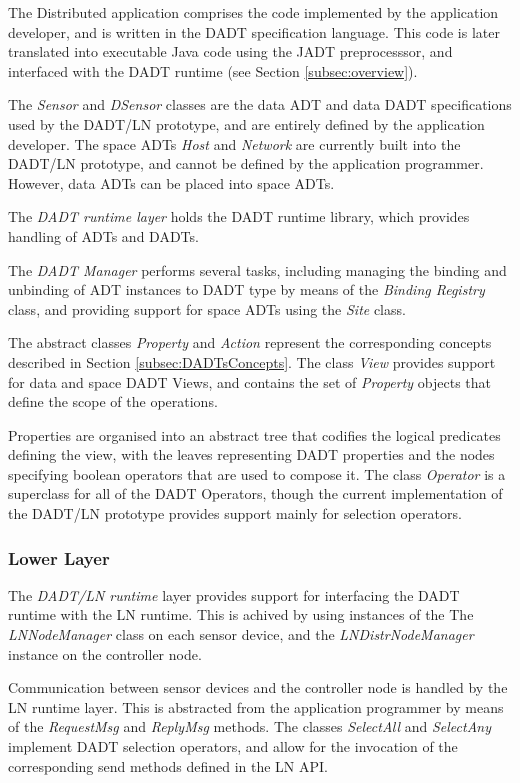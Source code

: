 The Distributed application comprises the code implemented by
the application developer, and is written in the DADT specification language. This code is later  translated into executable Java
code using the JADT preprocesssor, and interfaced with the DADT runtime (see Section \ref{subsec:overview}).

The \emph{Sensor} and \emph{DSensor} classes are the data
ADT and data DADT specifications used by the DADT/LN prototype, and are entirely
defined by the application developer. The space ADTs \emph{Host}
and \emph{Network} are currently built into the DADT/LN prototype, and cannot be defined by the application programmer. However, data ADTs can be placed into space ADTs.

The \emph{DADT runtime layer} holds the DADT runtime library, which provides
handling of ADTs and DADTs. 

The \emph{DADT Manager} performs several tasks, including managing the binding and unbinding
of ADT instances to DADT type by means of the  \emph{Binding Registry} class,
and providing support for space ADTs using the \emph{Site} class. 

The abstract classes \emph{Property} and \emph{Action} represent the
corresponding concepts described in Section \ref{subsec:DADTsConcepts}.
The class \emph{View} provides support for data and space DADT Views, and
contains the set of \emph{Property} objects that define the scope of the
operations. 

Properties are organised into an abstract tree that codifies the
logical predicates defining the view, with the leaves representing DADT
properties and the nodes specifying boolean operators that are used to compose it.
The class \emph{Operator} is a superclass for all of the DADT Operators, though
the current implementation of the DADT/LN prototype provides support mainly for
selection operators.

\subsubsection{Lower Layer}

The \emph{DADT/LN runtime} layer provides support for interfacing the DADT runtime
with the LN runtime. This is achived by using instances of the
The \emph{LNNodeManager} class on each sensor device, and the \emph{LNDistrNodeManager}
instance on the controller node.

Communication between sensor devices and the controller node is handled by the LN
runtime layer. This is abstracted from the application programmer by means of the 
\emph{RequestMsg} and \emph{ReplyMsg} methods. The classes \emph{SelectAll} and \emph{SelectAny} implement DADT selection operators, and allow for the invocation of
the corresponding send methods defined in the LN API.

